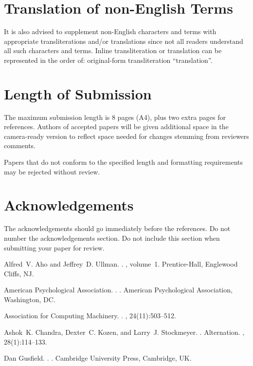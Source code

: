 \documentclass[11pt]{article}
\begin{document}
\section{Translation of non-English Terms}

It is also advised to supplement non-English characters and terms
with appropriate transliterations and/or translations
since not all readers understand all such characters and terms.
Inline transliteration or translation can be represented in
the order of: original-form transliteration ``translation''.

\section{Length of Submission}
\label{sec:length}

The maximum submission length is 8 pages (A4), plus two extra pages for
references. Authors of accepted papers will be given additional space in
the camera-ready version to reflect space needed for changes stemming
from reviewers comments.

Papers that do not
conform to the specified length and formatting requirements may be
rejected without review.



\section*{Acknowledgements}

The acknowledgements should go immediately before the references.  Do
not number the acknowledgements section. Do not include this section
when submitting your paper for review.

%
%

\begin{thebibliography}{}

Alfred~V. Aho and Jeffrey~D. Ullman.
.
, volume~1.
\newblock Prentice-{Hall}, Englewood Cliffs, NJ.

{American Psychological Association}.
.
.
\newblock American Psychological Association, Washington, DC.

{Association for Computing Machinery}.
.
, 24(11):503--512.

Ashok~K. Chandra, Dexter~C. Kozen, and Larry~J. Stockmeyer.
.
\newblock Alternation.
,
  28(1):114--133.

Dan Gusfield.
.
.
\newblock Cambridge University Press, Cambridge, UK.

\end{thebibliography}
\end{document}

